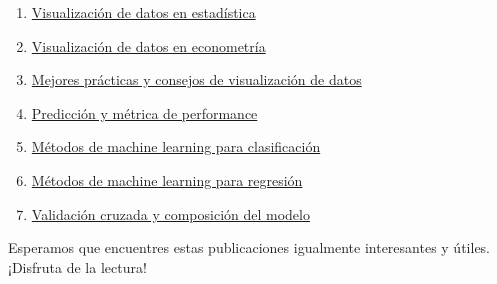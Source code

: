 \documentclass[
  a4paper,
]{article}
\begin{document}
\begin{enumerate}
{  de datos en macroeconomía}
\item
  \href{../2023-07-05-visualizacion-de-datos-en-estadistica-con-python/index.qmd}{Visualización
  de datos en estadística}
\item
  \href{../2023-07-06-visualizacion-de-datos-en-econometria-con-python/index.qmd}{Visualización
  de datos en econometría}
\item
  \href{../2023-07-07-mejores-practicas-y-consejos-de-visualizacion-de-datos-con-python/index.qmd}{Mejores
  prácticas y consejos de visualización de datos}
\item
  \href{../2023-07-08-08-prediccion-y-metrica-de-performance-con-python/index.qmd}{Predicción
  y métrica de performance}
\item
  \href{../2023-07-09-09-metodos-de-machine-learning-para-clasificacion-con-python/index.qmd}{Métodos
  de machine learning para clasificación}
\item
  \href{../2023-07-10-10-metodos-de-machine-learning-para-regresion-con-python/index.qmd}{Métodos
  de machine learning para regresión}
\item
  \href{../2023-07-11-11-validacion-cruzada-y-composicion-del-modelo-con-python/index.qmd}{Validación
  cruzada y composición del modelo}
\end{enumerate}

Esperamos que encuentres estas publicaciones igualmente interesantes y
útiles. ¡Disfruta de la lectura!


\printbibliography
\end{document}
